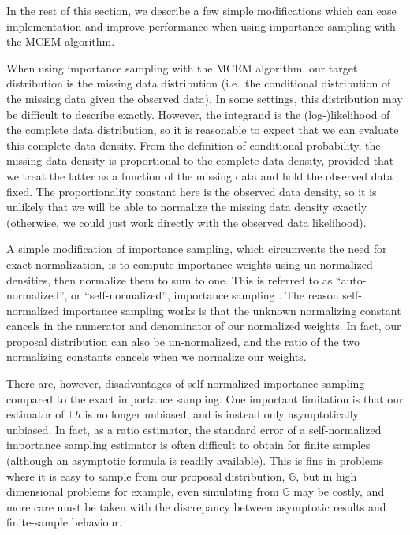 \documentclass[11pt, oneside]{article}   	%
\newcommand{\bF}{\mathbb{F}}
\newcommand{\bG}{\mathbb{G}}
\begin{document}
In the rest of this section, we describe a few simple modifications which can ease implementation and improve performance when using importance sampling with the MCEM algorithm.

When using importance sampling with the MCEM algorithm, our target distribution is the missing data distribution (i.e.\ the conditional distribution of the missing data given the observed data). In some settings, this distribution may be difficult to describe exactly. However, the integrand is the (log-)likelihood of the complete data distribution, so it is reasonable to expect that we can evaluate this complete data density. From the definition of conditional probability, the missing data density is proportional to the complete data density, provided that we treat the latter as a function of the missing data and hold the observed data fixed. The proportionality constant here is the observed data density, so it is unlikely that we will be able to normalize the missing data density exactly (otherwise, we could just work directly with the observed data likelihood). 

A simple modification of importance sampling, which circumvents the need for exact normalization, is to compute importance weights using un-normalized densities, then normalize them to sum to one. This is referred to as ``auto-normalized'', or ``self-normalized'', importance sampling \citep[see, e.g.,][]{Elv22}. The reason self-normalized importance sampling works is that the unknown normalizing constant cancels in the numerator and denominator of our normalized weights. In fact, our proposal distribution can also be un-normalized, and the ratio of the two normalizing constants cancels when we normalize our weights.

There are, however, disadvantages of self-normalized importance sampling compared to the exact importance sampling. One important limitation is that our estimator of $\bF h$ is no longer unbiased, and is instead only asymptotically unbiased. In fact, as a ratio estimator, the standard error of a self-normalized importance sampling estimator is often difficult to obtain for finite samples (although an asymptotic formula is readily available). This is fine in problems where it is easy to sample from our proposal distribution, $\bG$, but in high dimensional problems for example, even simulating from $\bG$ may be costly, and more care must be taken with the discrepancy between asymptotic results and finite-sample behaviour.
\end{document}
